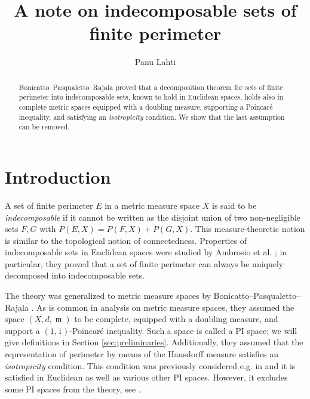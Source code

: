 \documentclass[11pt]{article}
\numberwithin{equation}{section}
\theoremstyle{plain}
\theoremstyle{definition}
\numberwithin{equation}{section}
\DeclareMathOperator{\frm}{\mathfrak{m}}
\begin{document}
\title{A note on indecomposable sets of finite perimeter
\let\thefootnote\relax{}}
\author{Panu Lahti}
\maketitle

\begin{abstract}
Bonicatto--Pasqualetto--Rajala \cite{BPR} proved that a decomposition theorem for sets of finite perimeter
into indecomposable sets, known to hold in Euclidean spaces, holds also in complete metric spaces equipped with
a doubling measure, supporting a Poincar\'e inequality, and satisfying an \emph{isotropicity}
condition. We show that the last assumption can be removed.
\end{abstract}

\section{Introduction}

A set of finite perimeter $E$ in a metric measure space $X$ is said to be \emph{indecomposable}
if it cannot be written as the disjoint union of two non-negligible sets $F,G$ with
$P(E,X)=P(F,X)+P(G,X)$. This measure-theoretic notion is similar to the topological notion of
connectedness. Properties of indecomposable sets in Euclidean spaces were studied by
Ambrosio et al. \cite{ACMM}; in particular, they proved that a set of finite perimeter can always
be uniquely decomposed into indecomposable sets. 

The theory was generalized to metric measure spaces by
Bonicatto--Pasqualetto--Rajala \cite{BPR}. As is common in analysis on metric measure spaces,
they assumed the space $(X,d,\frm)$ to be complete, equipped with a doubling measure, and support
a $(1,1)$-Poincar\'e inequality.
Such a space is called a PI space;
we will give definitions in Section \ref{sec:preliminaries}.
Additionally, they assumed that the representation of perimeter by means of the Hausdorff measure
satisfies an \emph{isotropicity} condition. This condition was previously
considered e.g. in \cite[Section 7]{AMP} and it is satisfied in Euclidean as well
as various other PI spaces. However, it excludes some PI spaces from the theory, see \cite[Example 1.27]{BPR}.
\end{document}
